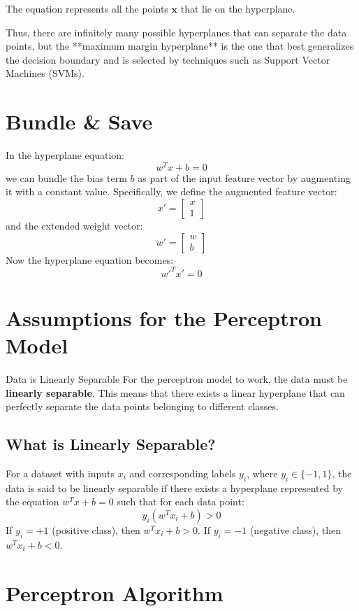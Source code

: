 The equation represents all the points \(\mathbf{x}\) that lie on the hyperplane.

Thus, there are infinitely many possible hyperplanes that can separate the data points, but the **maximum margin hyperplane** is the one that best generalizes the decision boundary and is selected by techniques such as Support Vector Machines (SVMs).
\section{Bundle \& Save}

In the hyperplane equation:
\[
w^T x + b = 0
\]
we can bundle the bias term \( b \) as part of the input feature vector by augmenting it with a constant value. Specifically, we define the augmented feature vector:
\[
x' = \begin{bmatrix} x \\ 1 \end{bmatrix}
\]
and the extended weight vector:
\[
w' = \begin{bmatrix} w \\ b \end{bmatrix}
\]
Now the hyperplane equation becomes:
\[
w'^T x' = 0
\]

\section{Assumptions for the Perceptron Model}

Data is Linearly Separable
For the perceptron model to work, the data must be \textbf{linearly separable}. This means that there exists a linear hyperplane that can perfectly separate the data points belonging to different classes. 

\subsection{What is Linearly Separable?}
For a dataset with inputs \( x_i \) and corresponding labels \( y_i \), where \( y_i \in \{-1, 1\} \), the data is said to be linearly separable if there exists a hyperplane represented by the equation \( w^T x + b = 0 \) such that for each data point:
\[
y_i (w^T x_i + b) > 0
\]
If \( y_i = +1 \) (positive class), then \( w^T x_i + b > 0 \).
If \( y_i = -1 \) (negative class), then \( w^T x_i + b < 0 \).


\section{Perceptron Algorithm}

